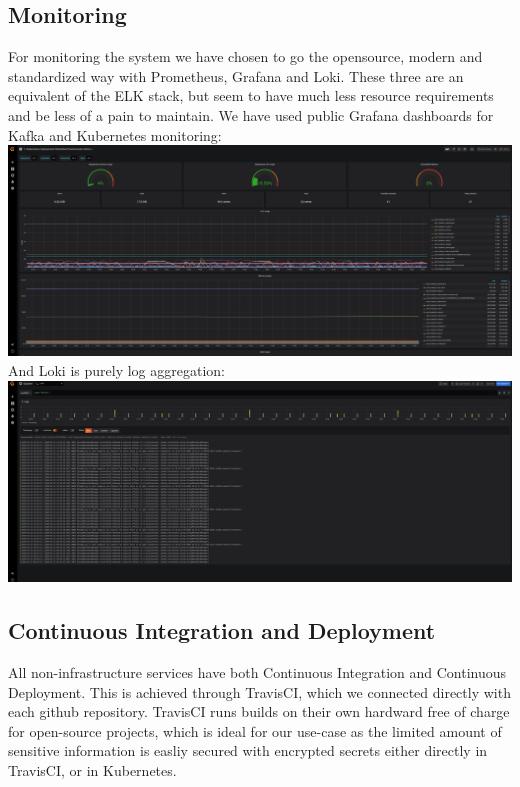 \subsection{Monitoring}
For monitoring the system we have chosen to go the opensource, modern and standardized way with Prometheus, Grafana and Loki.
These three are an equivalent of the ELK stack, but seem to have much less resource requirements and be less of a pain to maintain.
We have used public Grafana dashboards for Kafka and Kubernetes monitoring:\\
\includegraphics[scale=0.133]{grafana.png}\\
And Loki is purely log aggregation:\\
\includegraphics[scale=0.133]{loki.png}\\

\newpage
\subsection{Continuous Integration and Deployment}
All non-infrastructure services have both Continuous Integration and Continuous Deployment. 
This is achieved through TravisCI, which we connected directly with each github repository. 
TravisCI runs builds on their own hardward free of charge for open-source projects, which is ideal for our use-case as the limited amount of sensitive information is easliy secured with encrypted secrets either directly in TravisCI, or in Kubernetes.

